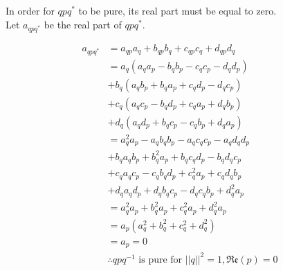 \documentclass[12pt, a4paper]{article}
\begin{document}
In order for $qpq^*$ to be pure, its real part must be equal to zero. \\
Let $a_{qpq^*}$ be the real part of $qpq^*$.

\begin{align*}
    a_{qpq^*} & = a_{qp}a_q + b_{qp}b_q + c_{qp}c_q + d_{qp}d_q                            \\
              & = a_q(a_qa_p - b_qb_p - c_qc_p - d_qd_p)                                   \\
              & + b_q(a_qb_p + b_qa_p + c_qd_p - d_qc_p)                                   \\
              & + c_q(a_qc_p - b_qd_p + c_qa_p + d_qb_p)                                   \\
              & + d_q(a_qd_p + b_qc_p - c_qb_p + d_qa_p)                                   \\
              & =a_q^2a_p - a_qb_qb_p - a_qc_qc_p - a_qd_qd_p                              \\
              & + b_qa_qb_p + b_q^2a_p + b_qc_qd_p - b_qd_qc_p                             \\
              & + c_qa_qc_p - c_qb_qd_p + c_q^2a_p + c_qd_qb_p                             \\
              & + d_qa_qd_p + d_qb_qc_p - d_qc_qb_p + d_q^2a_p                             \\
              & = a_q^2a_p + b_q^2a_p + c_q^2a_p + d_q^2a_p                                \\
              & = a_p(a_q^2 + b_q^2 + c_q^2 + d_q^2)                                       \\
              & = a_p = 0                                                                  \\
              & \therefore qpq^{-1} \text{ is pure for } ||q||^2 = 1, \mathfrak{Re}(p) = 0
\end{align*}
\end{document}
